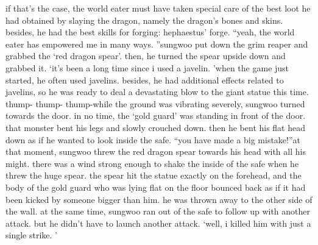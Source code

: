 if that’s the case, the world eater must have taken special care of the best loot he had obtained by slaying the dragon, namely the dragon’s bones and skins.
 besides, he had the best skills for forging: hephaestus’ forge.
“yeah, the world eater has empowered me in many ways.
”sungwoo put down the grim reaper and grabbed the ‘red dragon spear’.
 then, he turned the spear upside down and grabbed it.
‘it’s been a long time since i used a javelin.
’when the game just started, he often used javelins.
 besides, he had additional effects related to javelins, so he was ready to deal a devastating blow to the giant statue this time.
thump- thump- thump-while the ground was vibrating severely, sungwoo turned towards the door.
 in no time, the ‘gold guard’ was standing in front of the door.
that monster bent his legs and slowly crouched down.
 then he bent his flat head down as if he wanted to look inside the safe.
“you have made a big mistake!”at that moment, sungwoo threw the red dragon spear towards his head with all his might.
there was a wind strong enough to shake the inside of the safe when he threw the huge spear.
the spear hit the statue exactly on the forehead, and the body of the gold guard who was lying flat on the floor bounced back as if it had been kicked by someone bigger than him.
 he was thrown away to the other side of the wall.
at the same time, sungwoo ran out of the safe to follow up with another attack.
but he didn’t have to launch another attack.
‘well, i killed him with just a single strike.
’

 